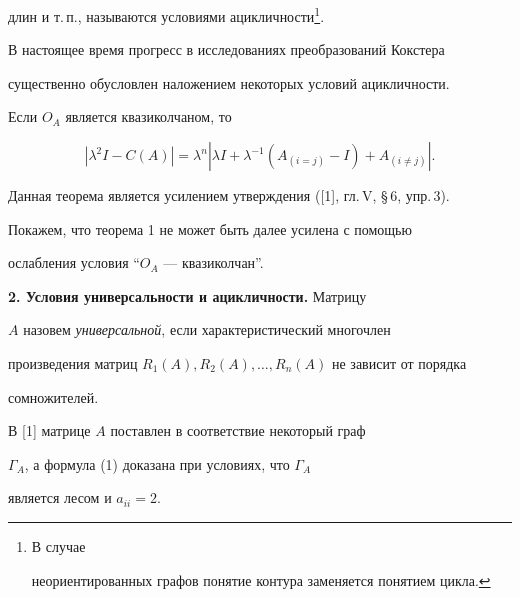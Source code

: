 длин и т.\,п., называются условиями ацикличности\footnote{В случае 


неориентированных графов понятие контура заменяется понятием цикла.}. 


В настоящее время прогресс в исследованиях преобразований Кокстера 


существенно обусловлен наложением некоторых условий ацикличности. 


\setcounter{footnote}{0}




 


\begin{thm} 


Если $O_A$ является квазиколчаном, то 


\begin{equation} 


|\lambda^2I-C(A)|=\lambda^n|\lambda I+\lambda^{-1}(A_{(i=j)}-I) 


+A_{(i\ne j)}|. 


\end{equation} 


\end{thm} 


 


Данная теорема является усилением утверждения ([1], гл.\,V, \S\,6, упр.\,3). 


Покажем, что теорема 1 не может быть далее усилена с помощью  


ослабления условия ``$O_A$ --- квазиколчан''. 


\medskip 


 


{\bf 2. Условия универсальности и ацикличности.} Матрицу 


$A$ назовем {\it универсальной}, если характеристический многочлен 


произведения матриц $R_1(A),R_2(A),\dotsc,R_n(A)$ не зависит от порядка 


сомножителей. 


 


В [1] матрице $A$ поставлен в соответствие некоторый граф 


$\Gamma_A$, а формула (1) доказана при условиях, что $\Gamma_A$


является лесом и $a_{ii}=2$. 


